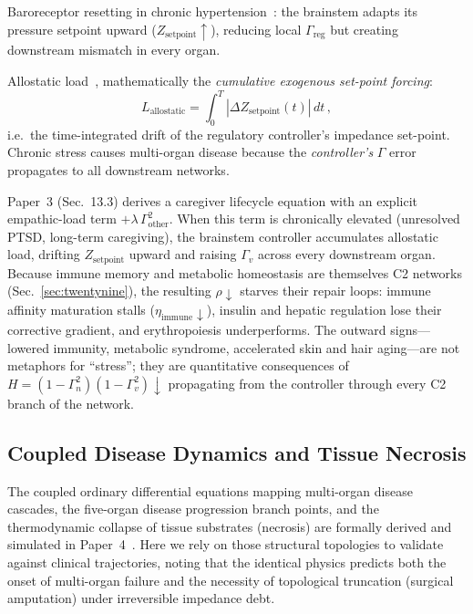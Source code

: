 \documentclass[aps,pre,twocolumn,superscriptaddress,floatfix]{revtex4-2}
\begin{document}
Baroreceptor resetting in chronic
hypertension~\cite{Chapleau1991}:
the brainstem adapts its pressure setpoint upward
($Z_{\text{setpoint}} \uparrow$), reducing local
$\Gamma_{\text{reg}}$ but creating downstream mismatch
in every organ.

Allostatic load~\cite{McEwen1998},
mathematically the \emph{cumulative exogenous
set-point forcing}:
\begin{equation}
  L_{\text{allostatic}} = \int_0^T
  |\Delta Z_{\text{setpoint}}(t)|\,dt\,,
\end{equation}
i.e.\ the time-integrated drift of the regulatory
controller's impedance set-point.
Chronic stress causes multi-organ disease because
the \emph{controller's} $\Gamma$ error propagates
to all downstream networks.

\begin{remark}
\label{rem:trauma-somatic}
Paper~3 (Sec.~13.3) derives a caregiver lifecycle equation
with an explicit empathic-load term
$+\lambda\,\Gamma_{\text{other}}^2$.
When this term is chronically elevated (unresolved PTSD,
long-term caregiving), the brainstem controller
accumulates allostatic load, drifting
$Z_{\text{setpoint}}$ upward and raising
$\Gamma_v$ across every downstream organ.
Because immune memory and metabolic homeostasis are
themselves C2 networks
(Sec.~\ref{sec:twentynine}),
the resulting $\rho\!\downarrow$ starves their
repair loops:
immune affinity maturation stalls
($\eta_{\text{immune}}\!\downarrow$),
insulin and hepatic regulation lose their corrective
gradient, and erythropoiesis underperforms.
The outward signs---lowered immunity, metabolic syndrome,
accelerated skin and hair aging---are not metaphors for
``stress''; they are quantitative consequences of
$H = (1-\Gamma_n^2)(1-\Gamma_v^2)\!\downarrow$
propagating from the controller through every C2
branch of the network.
\end{remark}





\subsection{Coupled Disease Dynamics and Tissue Necrosis}
The coupled ordinary differential equations mapping multi-organ disease cascades, the five-organ disease progression branch points, and the thermodynamic collapse of tissue substrates (necrosis) are formally derived and simulated in Paper~4~\cite{Paper4}. Here we rely on those structural topologies to validate against clinical trajectories, noting that the identical physics predicts both the onset of multi-organ failure and the necessity of topological truncation (surgical amputation) under irreversible impedance debt.
\end{document}
